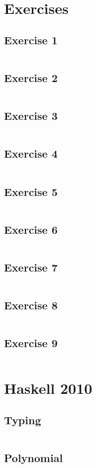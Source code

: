 \documentclass[a4paper,9pt]{article}
\newcommand{\hsfile}[1]{\inputminted[breaklines]{haskell}{../haskell/#1.hs}}
\begin{document}
\section{Exercises}
\subsection{Exercise 1}
\hsfile{ex01/ex01}
\subsection{Exercise 2}
\hsfile{ex02/ex02}
\subsection{Exercise 3}
\hsfile{ex03/ex03}
\subsection{Exercise 4}
\hsfile{ex04/ex04}
\subsection{Exercise 5}
\hsfile{ex05/ex05}
\subsection{Exercise 6}
\hsfile{ex06/ex06}
\subsection{Exercise 7}
\hsfile{ex07/ex07}
\subsection{Exercise 8}
\hsfile{ex08/ex08}
\subsection{Exercise 9}
\hsfile{ex09/ex09}
\section{Haskell 2010}
\subsection{Typing}
\hsfile{exam2010/problem_1}
\subsection{Polynomial}
\hsfile{exam2010/problem_2}
\end{document}
